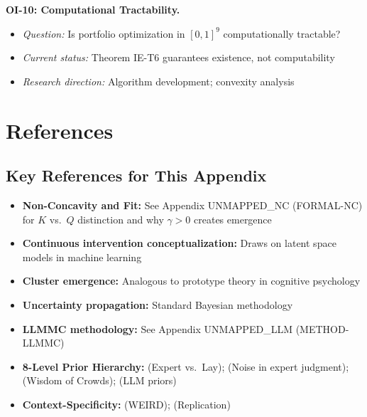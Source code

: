 \begin{tcolorbox}[colback=yellow!5!white, colframe=yellow!75!black,
    title=\textbf{Open Issues: Research Agenda for EIT}]
\textbf{OI-10: Computational Tractability.}
\begin{itemize}[nosep]
    \item \textit{Question:} Is portfolio optimization in $[0,1]^9$ computationally tractable?
    \item \textit{Current status:} Theorem IE-T6 guarantees existence, not computability
    \item \textit{Research direction:} Algorithm development; convexity analysis
\end{itemize}

\end{tcolorbox}


\section{References}
\label{sec:ie-references}

\nocite{bcm_master}

\subsection{Key References for This Appendix}

\begin{itemize}[nosep]
\item \textbf{Non-Concavity and Fit:} See Appendix UNMAPPED_NC (FORMAL-NC) for $K$ vs.\ $Q$ distinction and why $\gamma > 0$ creates emergence
\item \textbf{Continuous intervention conceptualization:} Draws on latent space models in machine learning
\item \textbf{Cluster emergence:} Analogous to prototype theory in cognitive psychology
\item \textbf{Uncertainty propagation:} Standard Bayesian methodology
\item \textbf{LLMMC methodology:} See Appendix UNMAPPED_LLM (METHOD-LLMMC)
\item \textbf{8-Level Prior Hierarchy:} \citet{dellavigna2016predict, dellavigna2018motivates} (Expert vs.\ Lay); \citet{kahneman2015noise} (Noise in expert judgment); \citet{surowiecki2004wisdom} (Wisdom of Crowds); \citet{zhu2024eliciting, scientificreports2025llmpriors} (LLM priors)
\item \textbf{Context-Specificity:} \citet{henrich2000cooperation} (WEIRD); \citet{camerer2016evaluating} (Replication)
\end{itemize}

